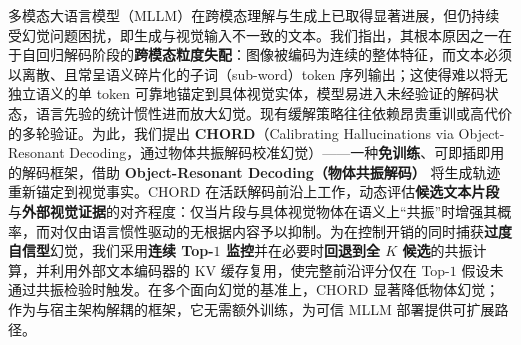 多模态大语言模型（MLLM）在跨模态理解与生成上已取得显著进展，但仍持续受幻觉问题困扰，即生成与视觉输入不一致的文本。我们指出，其根本原因之一在于自回归解码阶段的\textbf{跨模态粒度失配}：图像被编码为连续的整体特征，而文本必须以离散、且常呈语义碎片化的子词（sub-word）token 序列输出；这使得难以将无独立语义的单 token 可靠地锚定到具体视觉实体，模型易进入未经验证的解码状态，语言先验的统计惯性进而放大幻觉。现有缓解策略往往依赖昂贵重训或高代价的多轮验证。为此，我们提出 \textbf{CHORD}（Calibrating Hallucinations via Object-Resonant Decoding，通过物体共振解码校准幻觉）——一种\textbf{免训练}、可即插即用的解码框架，借助 \textbf{Object-Resonant Decoding（物体共振解码）} 将生成轨迹重新锚定到视觉事实。CHORD 在活跃解码前沿上工作，动态评估\textbf{候选文本片段}与\textbf{外部视觉证据}的对齐程度：仅当片段与具体视觉物体在语义上``共振''时增强其概率，而对仅由语言惯性驱动的无根据内容予以抑制。为在控制开销的同时捕获\textbf{过度自信型}幻觉，我们采用\textbf{连续 Top-$1$ 监控}并在必要时\textbf{回退到全 $K$ 候选}的共振计算，并利用外部文本编码器的 KV 缓存复用，使完整前沿评分仅在 Top-$1$ 假设未通过共振检验时触发。在多个面向幻觉的基准上，CHORD 显著降低物体幻觉；作为与宿主架构解耦的框架，它无需额外训练，为可信 MLLM 部署提供可扩展路径。
